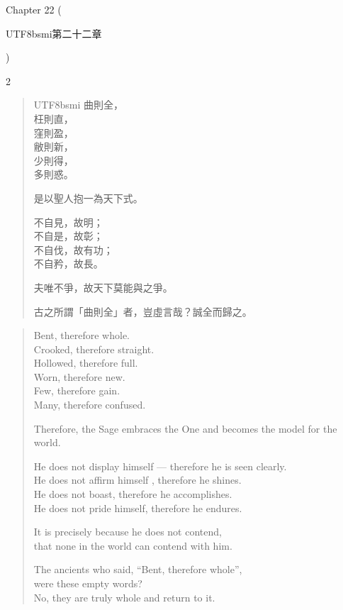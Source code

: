 Chapter 22 (\begin{CJK*}{UTF8}{bsmi}第二十二章\end{CJK*})
\begin{paracol}{2}
\begin{verse}
\begin{CJK*}{UTF8}{bsmi}
曲則全，\\ 枉則直，\\ 窪則盈，\\ 敝則新，\\ 少則得，\\ 多則惑。

是以聖人抱一為天下式。

不自見，故明；\\ 不自是，故彰；\\ 不自伐，故有功；\\ 不自矜，故長。

夫唯不爭，故天下莫能與之爭。

古之所謂「曲則全」者，豈虛言哉？誠全而歸之。
\end{CJK*}
\end{verse}
\switchcolumn
\begin{verse}
Bent, therefore whole.\\ Crooked, therefore straight.\\ Hollowed, therefore full.\\ Worn, therefore new.\\ Few, therefore gain.\\ Many, therefore confused.

Therefore, the Sage embraces the One and becomes the model for the world.

He does not display himself --- therefore he is seen clearly.\\ He does not affirm himself , therefore he shines.\\ He does not boast, therefore he accomplishes.\\ He does not pride himself, therefore he endures.

It is precisely because he does not contend,\\ that none in the world can contend with him.

The ancients who said, ``Bent, therefore whole'',\\ were these empty words?\\ No, they are truly whole and return to it.
\end{verse} 
\end{paracol}


